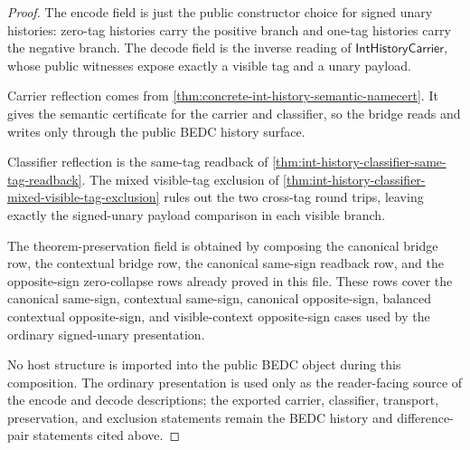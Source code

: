 \begin{proof}
The encode field is just the public constructor choice for signed unary
histories: zero-tag histories carry the positive branch and one-tag histories
carry the negative branch. The decode field is the inverse reading of
$\mathsf{IntHistoryCarrier}$, whose public witnesses expose exactly a visible
tag and a unary payload.

Carrier reflection comes from
\autoref{thm:concrete-int-history-semantic-namecert}. It gives the semantic
certificate for the carrier and classifier, so the bridge reads and writes only
through the public BEDC history surface.

Classifier reflection is the same-tag readback of
\autoref{thm:int-history-classifier-same-tag-readback}. The mixed visible-tag
exclusion of \autoref{thm:int-history-classifier-mixed-visible-tag-exclusion}
rules out the two cross-tag round trips, leaving exactly the signed-unary
payload comparison in each visible branch.

The theorem-preservation field is obtained by composing the canonical bridge
row, the contextual bridge row, the canonical same-sign readback row, and the
opposite-sign zero-collapse rows already proved in this file. These rows cover
the canonical same-sign, contextual same-sign, canonical opposite-sign, balanced
contextual opposite-sign, and visible-context opposite-sign cases used by the
ordinary signed-unary presentation.

No host structure is imported into the public BEDC object during this
composition. The ordinary presentation is used only as the reader-facing source
of the encode and decode descriptions; the exported carrier, classifier,
transport, preservation, and exclusion statements remain the BEDC history and
difference-pair statements cited above.
\end{proof}
